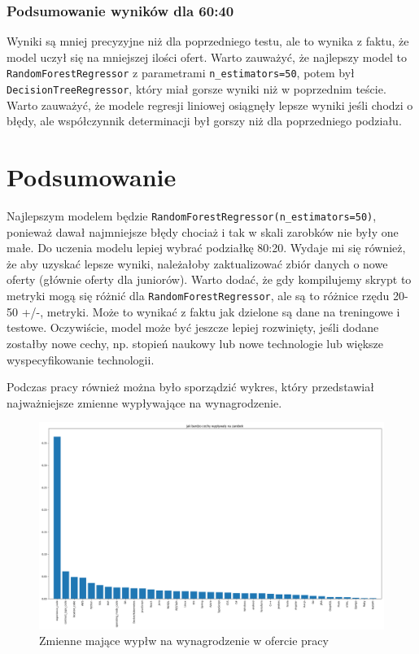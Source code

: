 \documentclass[a4paper]{article}
\begin{document}
\subsubsection{Podsumowanie wyników dla 60:40}


\quad Wyniki są mniej precyzyjne niż dla poprzedniego testu, ale to wynika z faktu, że model uczył się na mniejszej
ilości ofert. Warto zauważyć, że najlepszy model to \texttt{RandomForestRegressor} z parametrami \texttt{n\_estimators=50},
potem był \texttt{DecisionTreeRegressor}, który miał gorsze wyniki niż w poprzednim teście. Warto zauważyć, że modele regresji liniowej osiągnęły lepsze wyniki jeśli chodzi o błędy, ale współczynnik determinacji był gorszy niż dla poprzedniego podziału.

\section{Podsumowanie}
\quad Najlepszym modelem będzie \texttt{RandomForestRegressor(n\_estimators=50)},
ponieważ dawał najmniejsze błędy chociaż i tak w skali zarobków nie były one małe.
Do uczenia modelu lepiej wybrać podziałkę 80:20. Wydaje mi się również, że aby uzyskać lepsze wyniki,
należałoby zaktualizować zbiór danych o nowe oferty (głównie oferty dla juniorów). Warto dodać, że
gdy kompilujemy skrypt to metryki mogą się różnić dla \texttt{RandomForestRegressor}, ale są to różnice rzędu 20-50 +/-, metryki. Może to wynikać z faktu jak dzielone są dane na treningowe i testowe.
Oczywiście, model może być jeszcze lepiej rozwinięty, jeśli dodane zostałby nowe cechy, np. stopień naukowy lub nowe technologie lub większe wyspecyfikowanie technologii.

\quad Podczas pracy również można było sporządzić wykres, który przedstawiał najważniejsze zmienne wypływające na wynagrodzenie.

\begin{figure}[H]
    \centering
    \includegraphics[width=\textwidth]{../analysis/plots/wyniki/importance_of_vars.png}
    \caption{Zmienne mające wypłw na wynagrodzenie w ofercie pracy}
\end{figure}
\end{document}
